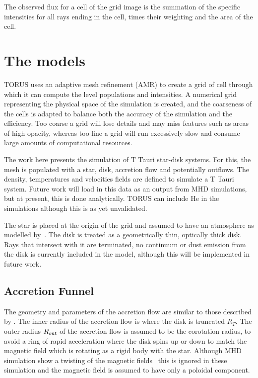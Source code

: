 \documentclass[fleqn,usenatbib]{mnras}
\begin{document}
The observed flux for a cell of the grid image is the summation of the specific intensities for all rays ending in the cell, times their weighting and the area of the cell.

\section{The models}
\label{sec:model}
TORUS uses an adaptive mesh refinement (AMR) to create a grid of cell through which it can compute the level populations and intensities.  A numerical grid representing the physical space of the simulation is created, and the coarseness of the cells is adapted to balance both the accuracy of the simulation and the efficiency. Too coarse a grid will lose details and may miss features such as areas of high opacity, whereas too fine a grid will run excessively slow and consume large amounts of computational resources.

The work here presents the simulation of T Tauri star-disk systems. For this, the mesh is populated with a star, disk, accretion flow and potentially outflows. The density, temperatures and velocities fields are defined to simulate a T Tauri system. Future work will load in this data as an output from MHD simulations, but at present, this is done analytically. TORUS can include He in the simulations although this is as yet unvalidated. 

The star is placed at the origin of the grid and assumed to have an atmosphere as modelled by~\citet{1979ApJS...40....1K}. The disk is treated as a geometrically thin, optically thick disk. Rays that intersect with it are terminated, no continuum or dust emission from the disk is currently included in the model, although this will be implemented in future work.

\subsection{Accretion Funnel}
\label{sec:accretionflow}
The geometry and parameters of the accretion flow are similar to those described by \citet{1998ApJ...495..385H}. The inner radius of the accretion flow is where the disk is truncated $R_{T}$. The outer radius $R_{\rm out}$ of the accretion flow is assumed to be the corotation radius, to avoid a ring of rapid acceleration where the disk spins up or down to match the magnetic field which is rotating as a rigid body with the star. Although MHD simulation show a twisting of the magnetic fields~\citep[e.g.][]{Uzdensky:2002dg} this is ignored in these simulation and the magnetic field is assumed to have only a poloidal component.
\end{document}
